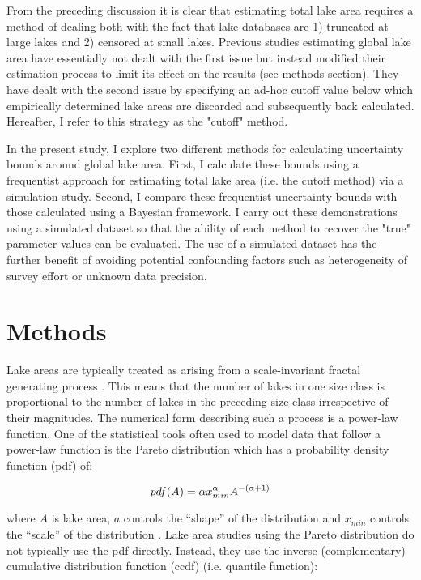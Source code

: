 \documentclass{article}
\begin{document}
From the preceding discussion it is clear that estimating total lake area requires a method of dealing both with the fact that lake databases are 1) truncated at large lakes and 2) censored at small lakes. Previous studies estimating global lake area have essentially not dealt with the first issue but instead modified their estimation process to limit its effect on the results (see methods section). They have dealt with the second issue by specifying an ad-hoc cutoff value below which empirically determined lake areas are discarded and subsequently back calculated. Hereafter, I refer to this strategy as the "cutoff" method.

In the present study, I explore two different methods for calculating uncertainty bounds around global lake area. First, I calculate these bounds using a frequentist approach for estimating total lake area (i.e. the cutoff method) via a simulation study. Second, I compare these frequentist uncertainty bounds with those calculated using a Bayesian framework. I carry out these demonstrations using a simulated dataset so that the ability of each method to recover the "true" parameter values can be evaluated. The use of a simulated dataset has the further benefit of avoiding potential confounding factors such as heterogeneity of survey effort or unknown data precision.

\section{Methods}

Lake areas are typically treated as arising from a scale-invariant fractal generating process \citep{winslowDoesLakeSize2015, downingGlobalAbundanceSize2006, mcdonald_regional_2012, goodchildLakesFractalSurfaces1988, hamiltonEstimationFractalDimension1992}. This means that the number of lakes in one size class is proportional to the number of lakes in the preceding size class irrespective of their magnitudes. The numerical form describing such a process is a power-law function. One of the statistical tools often used to model data that follow a power-law function is the Pareto distribution which has a probability density function (pdf) of:

\begin{equation}
	pdf(A) = \alpha x_{min}^{\alpha}A^{-(\alpha+1)} \\
	\label{eqn:pareto_pdf}
\end{equation}

where $A$ is lake area, $a$ controls the “shape” of the distribution and $x_{min}$ controls the “scale” of the distribution \citep{shaliziAdvancedDataAnalysis2017}. Lake area studies using the Pareto distribution do not typically use the pdf directly. Instead, they use the inverse (complementary) cumulative distribution function (ccdf) (i.e. quantile function):
\end{document}
